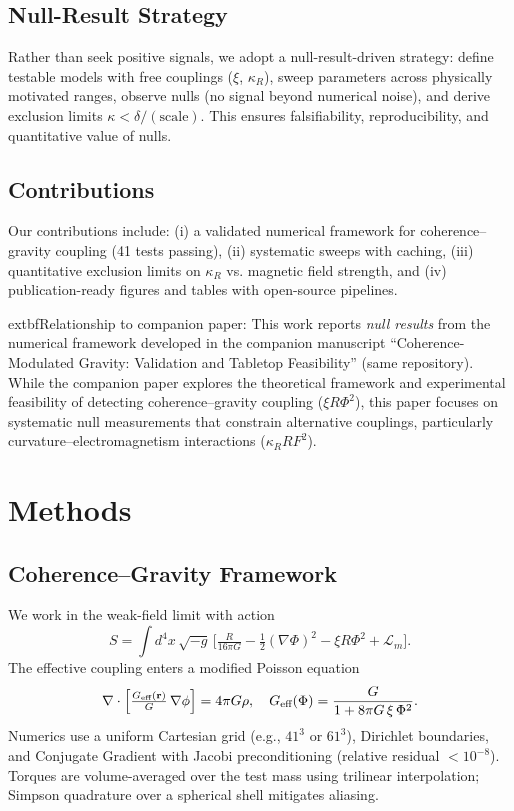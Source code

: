 \documentclass[10pt,twocolumn]{article}
\begin{document}
\subsection{Null-Result Strategy}
Rather than seek positive signals, we adopt a null-result-driven strategy: define testable models with free couplings ($\xi$, $\kappa_R$), sweep parameters across physically motivated ranges, observe nulls (no signal beyond numerical noise), and derive exclusion limits $\kappa < \delta/(\text{scale})$. This ensures falsifiability, reproducibility, and quantitative value of nulls.

\subsection{Contributions}
Our contributions include: (i) a validated numerical framework for coherence--gravity coupling (41 tests passing), (ii) systematic sweeps with caching, (iii) quantitative exclusion limits on $\kappa_R$ vs. magnetic field strength, and (iv) publication-ready figures and tables with open-source pipelines.

	extbf{Relationship to companion paper:} This work reports \emph{null results} from the numerical framework developed in the companion manuscript ``Coherence-Modulated Gravity: Validation and Tabletop Feasibility'' (same repository). While the companion paper explores the theoretical framework and experimental feasibility of detecting coherence--gravity coupling ($\xi R\Phi^2$), this paper focuses on systematic null measurements that constrain alternative couplings, particularly curvature--electromagnetism interactions ($\kappa_R R F^2$).

\section{Methods}
\subsection{Coherence--Gravity Framework}
We work in the weak-field limit with action
\begin{equation}
S = \int d^4x\,\sqrt{-g}\,\Big[\tfrac{R}{16\pi G} - \tfrac{1}{2}(\nabla\Phi)^2 - \xi R \Phi^2 + \mathcal{L}_m\Big].
\end{equation}
The effective coupling enters a modified Poisson equation
\begin{equation}
\nabla\cdot\Big[\tfrac{G_{\text{eff}}({\bf r})}{G}\,\nabla\phi\Big] = 4\pi G \rho,\quad G_{\text{eff}}(\Phi)=\frac{G}{1 + 8\pi G\,\xi\,\Phi^2}.
\end{equation}
Numerics use a uniform Cartesian grid (e.g., $41^3$ or $61^3$), Dirichlet boundaries, and Conjugate Gradient with Jacobi preconditioning (relative residual $<10^{-8}$). Torques are volume-averaged over the test mass using trilinear interpolation; Simpson quadrature over a spherical shell mitigates aliasing.
\end{document}
